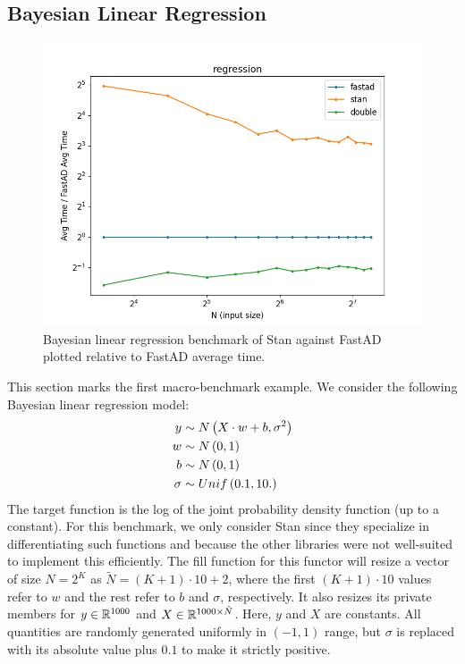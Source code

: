 \subsection{Bayesian Linear Regression}\label{ssec:regression}

\begin{figure}[t]
    \centering
    \includegraphics[width=\textwidth]{figs/regression_fig.png}
    \caption{%
        Bayesian linear regression benchmark of Stan against FastAD 
        plotted relative to FastAD average time.
    }\label{fig:regression}
\end{figure}

This section marks the first macro-benchmark example.
We consider the following Bayesian linear regression model:
\begin{align*}
    y &\sim N\left(X\cdot w + b, \sigma^2\right) \\
    w &\sim N\left(0,1\right) \\
    b &\sim N\left(0,1\right) \\
    \sigma &\sim Unif\left(0.1, 10.\right)
\end{align*}
The target function is the log of the joint probability density function (up to a constant).
For this benchmark, we only consider Stan since they specialize in differentiating such functions
and because the other libraries were not well-suited to implement this efficiently.
The fill function for this functor will resize a vector of size $N = 2^K$ as $\tilde{N} = (K + 1) \cdot 10 + 2$,
where the first $(K+1) \cdot 10$ values refer to $w$ and the rest refer to $b$ and $\sigma$, respectively.
It also resizes its private members for $y \in \mathbb{R}^{1000}$ and $X \in \mathbb{R}^{1000 \times \tilde{N}}$.
Here, $y$ and $X$ are constants.
All quantities are randomly generated uniformly in $(-1,1)$ range,
but $\sigma$ is replaced with its absolute value plus $0.1$ to make it strictly positive.

